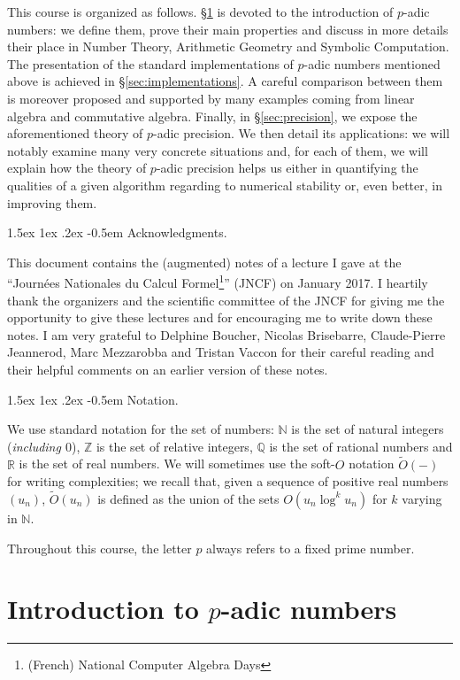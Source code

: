 \documentclass[11pt]{article}
\makeatletter
\numberwithin{equation}{section}
\numberwithin{figure}{section}
\renewcommand\subparagraph{\@startsection{subparagraph}{5}{\z@}%
                                       {1.5ex \@plus1ex \@minus .2ex}%
                                       {-0.5em}%
                                      {\normalfont\normalsize\it}}
\theoremstyle{definition}
\newcommand{\N}{\mathbb N}
\newcommand{\Z}{\mathbb Z}
\newcommand{\Q}{\mathbb Q}
\newcommand{\R}{\mathbb R}
\newcommand{\softO}{\tilde O}
\makeatother
\begin{document}
This course is organized as follows. 
\S \ref{sec:padicnumbers} is devoted to the introduction of $p$-adic 
numbers: we define them, prove their main properties and discuss in
more details their place in Number Theory, Arithmetic Geometry and 
Symbolic Computation.
The presentation of the standard implementations of $p$-adic numbers 
mentioned above is achieved in \S \ref{sec:implementations}. 
A careful comparison between them is moreover proposed and supported
by many examples coming from linear algebra and commutative algebra.
Finally, in \S \ref{sec:precision}, we expose the aforementioned theory 
of $p$-adic precision. We then detail its applications: we will notably
examine many very concrete situations and, for each of them, we will
explain how the theory of $p$-adic precision helps us either in quantifying 
the qualities of a given algorithm regarding to numerical stability or,
even better, in improving them.

\subparagraph{Acknowledgments.}

This document contains the (augmented) notes of a lecture I gave at the 
``Journées Nationales du Calcul Formel\footnote{(French) 
National Computer Algebra Days}'' (JNCF) on January 2017. I heartily thank 
the organizers and the scientific committee of the JNCF for giving me 
the opportunity to give these lectures and for encouraging me to write 
down these notes. I am very grateful to Delphine Boucher, 
Nicolas Brisebarre, Claude-Pierre 
Jeannerod, Marc Mezzarobba and Tristan Vaccon for their careful reading
and their helpful comments on an earlier version of these notes.

\subparagraph{Notation.}

We use standard notation for the set of numbers: $\N$ is the set of 
natural integers (\emph{including $0$}), $\Z$ is the set of relative 
integers, $\Q$ is the set of rational numbers and $\R$ is the set of 
real numbers.
We will sometimes use the soft-$O$ notation $\softO(-)$ for writing 
complexities; we recall that, given a sequence of positive real numbers 
$(u_n)$, $\softO(u_n)$ is defined as the union of the sets $O(u_n \log^k 
u_n)$ for $k$ varying in $\N$.

Throughout this course, the letter $p$ always refers to a fixed prime 
number.

\section{Introduction to $p$-adic numbers}
\label{sec:padicnumbers}
\end{document}
